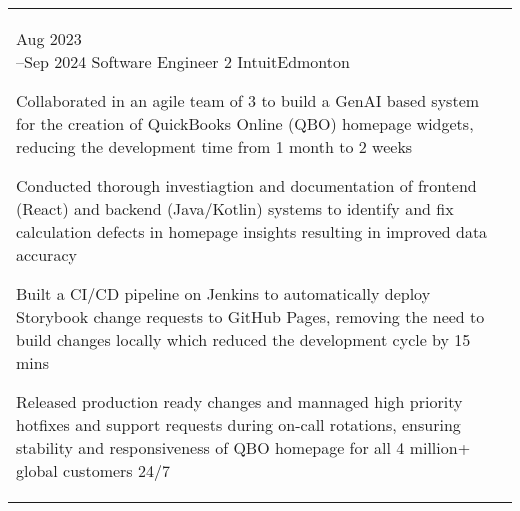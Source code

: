 

\section*{}

\begin{tabular}{@{\raggedright}p{} |>{\raggedright\arraybackslash}p{}}

    \cvevent{Aug 2023\newline --Sep 2024}
    {Software Engineer 2}
    {Intuit}{Edmonton}
    {\begin{tabitemize}
        \item Collaborated in an agile team of 3 to build a GenAI based system for the creation of QuickBooks Online (QBO) homepage widgets, reducing the development time from 1 month to 2 weeks
        \item Conducted thorough investiagtion and documentation of frontend (React) and backend (Java/Kotlin) systems to identify and fix calculation defects in homepage insights resulting in improved data accuracy
        \item Built a CI/CD pipeline on Jenkins to automatically deploy Storybook change requests to GitHub Pages, removing the need to build changes locally which reduced the development cycle by 15 mins
        \item Released production ready changes and mannaged high priority hotfixes and support requests during on-call rotations, ensuring stability and responsiveness of QBO homepage for all 4 million+ global customers 24/7
        \vspace{0.5em}
    \end{tabitemize}
    } \\


\end{tabular}
